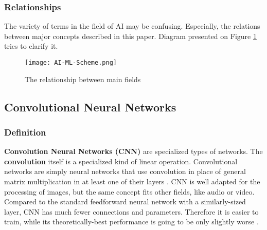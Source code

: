 \documentclass[../Main.tex]{subfiles}
\begin{document}
\newpage

    \subsubsection{Relationships}
    The variety of terms in the field of AI may be confusing. Especially, the relations between major concepts described in this paper. Diagram presented on Figure \ref{fig:AI-ML-Scheme} tries to clarify it.
    \\
    \begin{figure}[h!]
        \centering
        \texttt{[image: AI-ML-Scheme.png]}
        \caption{The relationship between main fields}
        \label{fig:AI-ML-Scheme}
    \end{figure}

\subsection{Convolutional Neural Networks}

    \subsubsection{Definition}
    \textbf{Convolution Neural Networks (CNN)} are specialized types of networks. The \textbf{convolution} itself is a specialized kind of linear operation. Convolutional networks are simply neural networks that use convolution in place of general matrix multiplication in at least one of their layers \cite{Goodfellow-et-al-2016}.  CNN is well adapted for the processing of images, but the same concept fits other fields, like audio or video. 
    Compared to the standard feedforward neural network with a similarly-sized layer, CNN has much fewer connections and parameters. Therefore it is easier to train, while its theoretically-best performance is going to be only slightly worse \cite{krizhevsky-imagenet}.
        
\end{document}
